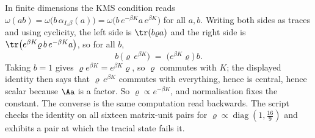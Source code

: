In finite dimensions the KMS condition reads $\omega(ab) = \omega\bigl(b\,\alpha_{I_4\beta}(a)\bigr) = \omega\bigl(b\,e^{-\beta K}a\,e^{\beta K}\bigr)$ for all $a, b$. Writing both sides as traces and using cyclicity, the left side is $\tr(b\varrho a)$ and the right side is $\tr\bigl(e^{\beta K}\varrho\, b\, e^{-\beta K} a\bigr)$, so for all $b$,
\[
b\,\bigl(\varrho\, e^{\beta K}\bigr) \;=\; \bigl(e^{\beta K}\varrho\bigr)\, b .
\]
Taking $b = 1$ gives $\varrho e^{\beta K} = e^{\beta K}\varrho$, so $\varrho$ commutes with $K$; the displayed identity then says that $\varrho\,e^{\beta K}$ commutes with everything, hence is central, hence scalar because $\Aa$ is a factor. So $\varrho \propto e^{-\beta K}$, and normalisation fixes the constant. The converse is the same computation read backwards. The script checks the identity on all sixteen matrix-unit pairs for $\varrho \propto \operatorname{diag}(1, \tfrac{16}{9})$ and exhibits a pair at which the tracial state fails it.
